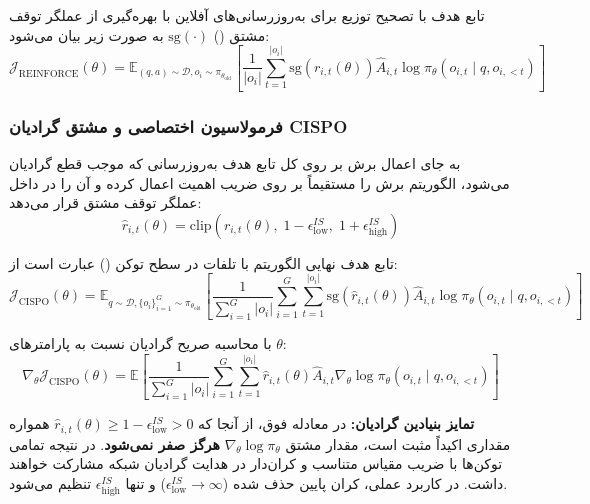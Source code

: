 تابع هدف  با تصحیح توزیع برای به‌روزرسانی‌های آفلاین با بهره‌گیری از عملگر توقف مشتق () $\text{sg}(\cdot)$ به صورت زیر بیان می‌شود:
\begin{equation}
	\mathcal{J}_{\text{REINFORCE}}(\theta) = \mathbb{E}_{(q,a) \sim \mathcal{D}, o_i \sim \pi_{\theta_{\text{old}}}} \left[ \frac{1}{|o_i|} \sum_{t=1}^{|o_i|} \text{sg}(r_{i,t}(\theta)) \hat{A}_{i,t} \log \pi_\theta(o_{i,t} \mid q, o_{i,<t}) \right]
\end{equation}

\subsubsection*{فرمولاسیون اختصاصی و مشتق گرادیان CISPO}

به جای اعمال برش بر روی کل تابع هدف به‌روزرسانی که موجب قطع گرادیان می‌شود، الگوریتم  برش را مستقیماً بر روی ضریب اهمیت اعمال کرده و آن را در داخل عملگر توقف مشتق قرار می‌دهد:
\begin{equation}
	\hat{r}_{i,t}(\theta) = \text{clip}\left( r_{i,t}(\theta), \; 1 - \epsilon_{\text{low}}^{IS}, \; 1 + \epsilon_{\text{high}}^{IS} \right)
\end{equation}

تابع هدف نهایی الگوریتم  با تلفات در سطح توکن () عبارت است از:
\begin{equation}
	\mathcal{J}_{\text{CISPO}}(\theta) = \mathbb{E}_{q \sim \mathcal{D}, \{o_i\}_{i=1}^G \sim \pi_{\theta_{\text{old}}}} \left[ \frac{1}{\sum_{i=1}^G |o_i|} \sum_{i=1}^G \sum_{t=1}^{|o_i|} \text{sg}\left(\hat{r}_{i,t}(\theta)\right) \hat{A}_{i,t} \log \pi_\theta(o_{i,t} \mid q, o_{i,<t}) \right]
\end{equation}

با محاسبه صریح گرادیان نسبت به پارامترهای $\theta$:
\begin{equation}
	\nabla_\theta \mathcal{J}_{\text{CISPO}}(\theta) = \mathbb{E} \left[ \frac{1}{\sum_{i=1}^G |o_i|} \sum_{i=1}^G \sum_{t=1}^{|o_i|} \hat{r}_{i,t}(\theta) \hat{A}_{i,t} \nabla_\theta \log \pi_\theta(o_{i,t} \mid q, o_{i,<t}) \right]
\end{equation}

\textbf{تمایز بنیادین گرادیان:} در معادله فوق، از آنجا که $\hat{r}_{i,t}(\theta) \ge 1 - \epsilon_{\text{low}}^{IS} > 0$ همواره مقداری اکیداً مثبت است، مقدار مشتق $\nabla_\theta \log \pi_\theta$ \textbf{هرگز صفر نمی‌شود}. در نتیجه تمامی توکن‌ها با ضریب مقیاس متناسب و کران‌دار در هدایت گرادیان شبکه مشارکت خواهند داشت. در کاربرد عملی، کران پایین حذف شده ($\epsilon_{\text{low}}^{IS} \to \infty$) و تنها $\epsilon_{\text{high}}^{IS}$ تنظیم می‌شود.

